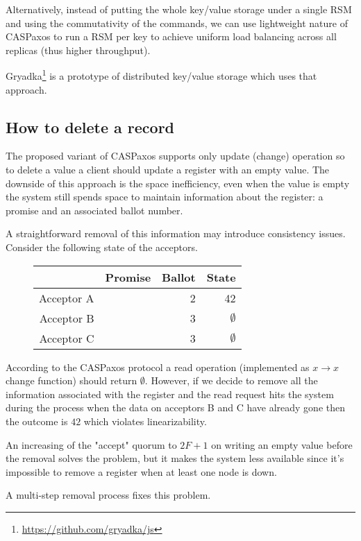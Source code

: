 \documentclass[12pt]{article}
\theoremstyle{definition}
\begin{document}
Alternatively, instead of putting the whole key/value storage under a single RSM and using the commutativity of the commands, we can use lightweight nature of CASPaxos to run a RSM per key to achieve uniform load balancing across all replicas (thus higher throughput).

Gryadka\footnote{\href{https://github.com/gryadka/js}{https://github.com/gryadka/js}} is a prototype of distributed key/value storage which uses that approach.

\subsection{How to delete a record}

The proposed variant of CASPaxos supports only update (change) operation so to delete a value a client should update a register with an empty value. The downside of this approach is the space inefficiency, even when the value is empty the system still spends space to maintain information about the register: a promise and an associated ballot number.

A straightforward removal of this information may introduce consistency issues. Consider the following state of the acceptors.

\begin{figure}[!h]
  \centering
  \begin{tabular}{ r|r|r|r }
    & Promise & Ballot & State \\ \hline
    Acceptor A && 2 & 42 \\
    Acceptor B && 3 & $\emptyset$ \\
    Acceptor C && 3 & $\emptyset$ \\
  \end{tabular}
\end{figure}

According to the CASPaxos protocol a read operation (implemented as $x \to x$ change function) should return $\emptyset$. However, if we decide to remove all the information associated with the register and the read request hits the system during the process when the data on acceptors B and C have already gone then the outcome is $42$ which violates linearizability.

An increasing of the "accept" quorum to $2F+1$ on writing an empty value before the removal solves the problem, but it makes the system less available since it's impossible to remove a register when at least one node is down.

A multi-step removal process fixes this problem.
\end{document}
